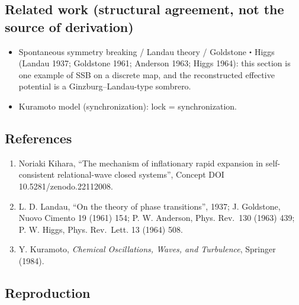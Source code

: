 \documentclass[
  a4paper,
]{ltjsarticle}
\providecommand{\tightlist}{%
  \setlength{\itemsep}{0pt}\setlength{\parskip}{0pt}}
\begin{document}
\subsection{Related work (structural agreement, not the source of
derivation)}\label{related-work-structural-agreement-not-the-source-of-derivation}

\begin{itemize}
\tightlist
\item
  Spontaneous symmetry breaking / Landau theory / Goldstone・Higgs
  (Landau 1937; Goldstone 1961; Anderson 1963; Higgs 1964): this section
  is one example of SSB on a discrete map, and the reconstructed
  effective potential is a Ginzburg--Landau-type sombrero.
\item
  Kuramoto model (synchronization): lock = synchronization.
\end{itemize}

\subsection{References}\label{references}

\begin{enumerate}
\def\labelenumi{\arabic{enumi}.}
\tightlist
\item
  Noriaki Kihara, ``The mechanism of inflationary rapid expansion in
  self-consistent relational-wave closed systems'', Concept DOI
  10.5281/zenodo.22112008.
\item
  L. D. Landau, ``On the theory of phase transitions'', 1937; J.
  Goldstone, Nuovo Cimento 19 (1961) 154; P. W. Anderson, Phys. Rev.~130
  (1963) 439; P. W. Higgs, Phys. Rev.~Lett. 13 (1964) 508.
\item
  Y. Kuramoto, \emph{Chemical Oscillations, Waves, and Turbulence},
  Springer (1984).
\end{enumerate}

\subsection{Reproduction}\label{reproduction}
\end{document}
